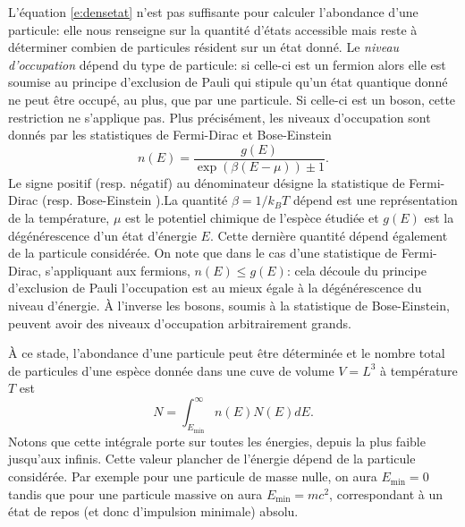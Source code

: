 L'équation \ref{e:densetat} n'est pas suffisante pour calculer l'abondance d'une particule: elle nous renseigne sur la quantité d'états accessible mais reste à déterminer combien de particules résident sur un état donné. Le \textit{niveau d'occupation} dépend du type de particule: si celle-ci est un fermion alors elle est soumise au principe d'exclusion de Pauli qui stipule qu'un état quantique donné ne peut être occupé, au plus, que par une particule. Si celle-ci est un boson, cette restriction ne s'applique pas. Plus précisément, les niveaux d'occupation sont donnés par les statistiques de Fermi-Dirac et Bose-Einstein
\begin{equation}
n(E)=\frac{g(E)}{\exp(\beta(E-\mu))\pm 1}.
\label{e:BEFD}
\end{equation}
Le signe positif (resp. négatif) au dénominateur désigne la statistique de Fermi-Dirac (resp. Bose-Einstein ).La quantité $\beta=1/k_B T$ dépend est une représentation de la température, $\mu$ est le potentiel chimique de l'espèce étudiée et $g(E)$ est la dégénérescence d'un état d'énergie $E$. Cette dernière quantité dépend également de la particule considérée. On note que dans le cas d'une statistique de Fermi-Dirac, s'appliquant aux fermions, $n(E)\le g(E)$: cela découle du principe d'exclusion de Pauli l'occupation est au mieux égale à la dégénérescence du niveau d'énergie. À l'inverse les bosons, soumis à la statistique de Bose-Einstein, peuvent avoir des niveaux d'occupation arbitrairement grands.

À ce stade, l'abondance d'une particule peut être déterminée et le nombre total de particules d'une espèce donnée dans une cuve de volume $V=L^3$ à température $T$ est
\begin{equation}
N=\int_{E_{\mathrm{min}}}^\infty n(E)N(E) dE.
\label{e:abondance}
\end{equation}
Notons que cette intégrale porte sur toutes les énergies, depuis la plus faible jusqu'aux infinis. Cette valeur plancher de l'énergie dépend de la particule considérée. Par exemple pour une particule de masse nulle, on aura $E_\mathrm{min}=0$ tandis que pour une particule massive on aura $E_\mathrm{min}=mc^2$, correspondant à un état de repos (et donc d'impulsion minimale) absolu.

